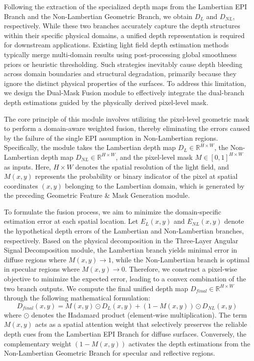 \documentclass[lettersize,journal]{IEEEtran}
\begin{document}
Following the extraction of the specialized depth maps from the Lambertian EPI Branch and the Non-Lambertian Geometric Branch, we obtain $D_L$ and $D_{NL}$, respectively. While these two branches accurately capture the depth structures within their specific physical domains, a unified depth representation is required for downstream applications. Existing light field depth estimation methods typically merge multi-domain results using post-processing global smoothness priors or heuristic thresholding. Such strategies inevitably cause depth bleeding across domain boundaries and structural degradation, primarily because they ignore the distinct physical properties of the surfaces. To address this limitation, we design the Dual-Mask Fusion module to effectively integrate the dual-branch depth estimations guided by the physically derived pixel-level mask.

The core principle of this module involves utilizing the pixel-level geometric mask to perform a domain-aware weighted fusion, thereby eliminating the errors caused by the failure of the single EPI assumption in Non-Lambertian regions. Specifically, the module takes the Lambertian depth map $D_L \in \mathbb{R}^{H \times W}$, the Non-Lambertian depth map $D_{NL} \in \mathbb{R}^{H \times W}$, and the pixel-level mask $M \in [0, 1]^{H \times W}$ as inputs. Here, $H \times W$ denotes the spatial resolution of the light field, and $M(x,y)$ represents the probability or binary indicator of the pixel at spatial coordinates $(x,y)$ belonging to the Lambertian domain, which is generated by the preceding Geometric Feature \& Mask Generation module.

To formulate the fusion process, we aim to minimize the domain-specific estimation error at each spatial location. Let $E_L(x,y)$ and $E_{NL}(x,y)$ denote the hypothetical depth errors of the Lambertian and Non-Lambertian branches, respectively. Based on the physical decomposition in the Three-Layer Angular Signal Decomposition module, the Lambertian branch yields minimal error in diffuse regions where $M(x,y) \to 1$, while the Non-Lambertian branch is optimal in specular regions where $M(x,y) \to 0$. Therefore, we construct a pixel-wise objective to minimize the expected error, leading to a convex combination of the two branch outputs. We compute the final unified depth map $D_{final} \in \mathbb{R}^{H \times W}$ through the following mathematical formulation:
\begin{equation} \label{eq:ch3_16}
D_{final}(x,y) = M(x,y) \odot D_L(x,y) + (1 - M(x,y)) \odot D_{NL}(x,y)
\end{equation}
where $\odot$ denotes the Hadamard product (element-wise multiplication). The term $M(x,y)$ acts as a spatial attention weight that selectively preserves the reliable depth cues from the Lambertian EPI Branch for diffuse surfaces. Conversely, the complementary weight $(1 - M(x,y))$ activates the depth estimations from the Non-Lambertian Geometric Branch for specular and reflective regions. 
\end{document}
